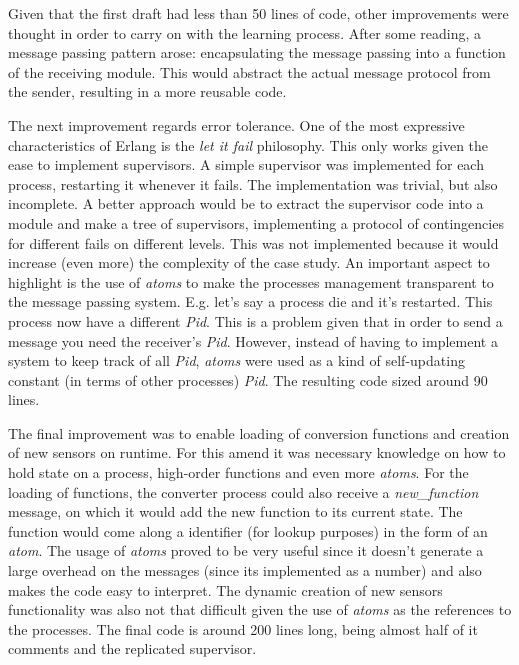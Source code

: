 \documentclass[twocolumn,10pt]{article}
\begin{document}
Given that the first draft had less than 50 lines of code, other improvements were thought in order to carry on with the learning process. After some reading, a message passing pattern arose: encapsulating the message passing into a function of the receiving module. This would abstract the actual message protocol from the sender, resulting in a more reusable code.

The next improvement regards error tolerance. One of the most expressive characteristics of Erlang is the \textit{let it fail} philosophy. This only works given the ease to implement supervisors. A simple supervisor was implemented for each process, restarting it whenever it fails. The implementation was trivial, but also incomplete. A better approach would be to extract the supervisor code into a module and make a tree of supervisors, implementing a protocol of contingencies for different fails on different levels. This was not implemented because it would increase (even more) the complexity of the case study. An important aspect to highlight is the use of \textit{atoms} to make the processes management transparent to the message passing system. E.g. let's say a process die and it's restarted. This process now have a different \textit{Pid}. This is a problem given that in order to send a message you need the receiver's \textit{Pid}. However, instead of having to implement a system to keep track of all \textit{Pid}, \textit{atoms} were used as a kind of self-updating constant (in terms of other processes) \textit{Pid}. The resulting code sized around 90 lines.

The final improvement was to enable loading of conversion functions and creation of new sensors on runtime. For this amend it was necessary knowledge on how to hold state on a process, high-order functions and even more \textit{atoms}. For the loading of functions, the converter process could also receive a \textit{new\_function} message, on which it would add the new function to its current state. The function would come along a identifier (for lookup purposes) in the form of an \textit{atom}. The usage of \textit{atoms} proved to be very useful since it doesn't generate a large overhead on the messages (since its implemented as a number) and also makes the code easy to interpret. The dynamic creation of new sensors functionality was also not that difficult given the use of \textit{atoms} as the references to the processes. The final code is around 200 lines long, being almost half of it comments and the replicated supervisor.
\end{document}
